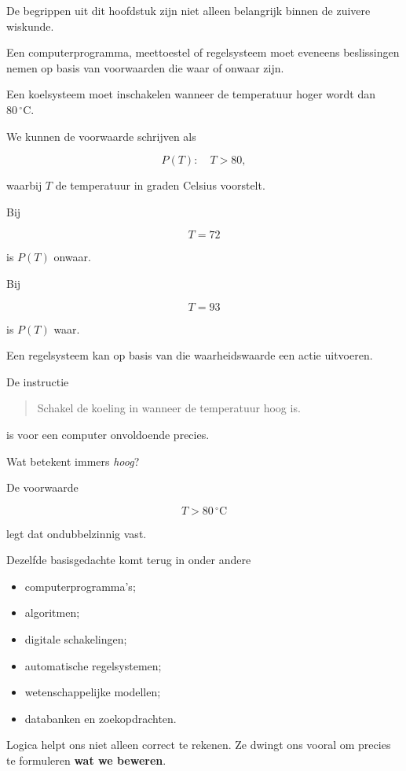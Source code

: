 \documentclass{ximera}
\begin{document}

De begrippen uit dit hoofdstuk zijn niet alleen belangrijk binnen de
zuivere wiskunde.

Een computerprogramma, meettoestel of regelsysteem moet eveneens
beslissingen nemen op basis van voorwaarden die waar of onwaar zijn.


\begin{voorbeeld}

Een koelsysteem moet inschakelen wanneer de temperatuur hoger wordt
dan $80\,{}^\circ\mathrm C$.

We kunnen de voorwaarde schrijven als

\[
P(T):\quad T>80,
\]

waarbij $T$ de temperatuur in graden Celsius voorstelt.

Bij

\[
T=72
\]

is $P(T)$ onwaar.

Bij

\[
T=93
\]

is $P(T)$ waar.

Een regelsysteem kan op basis van die waarheidswaarde een actie
uitvoeren.
\end{voorbeeld}


De instructie

\begin{quote}
Schakel de koeling in wanneer de temperatuur hoog is.
\end{quote}

is voor een computer onvoldoende precies.

Wat betekent immers \emph{hoog}?

De voorwaarde

\[
T>80\,{}^\circ\mathrm C
\]

legt dat ondubbelzinnig vast.


\begin{opmerking}
Dezelfde basisgedachte komt terug in onder andere

\begin{itemize}
  \item computerprogramma's;
  \item algoritmen;
  \item digitale schakelingen;
  \item automatische regelsystemen;
  \item wetenschappelijke modellen;
  \item databanken en zoekopdrachten.
\end{itemize}

Logica helpt ons niet alleen correct te rekenen.
Ze dwingt ons vooral om precies te formuleren
\textbf{wat we beweren}.
\end{opmerking}
\end{document}

